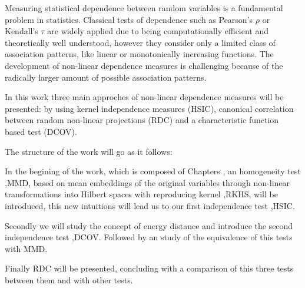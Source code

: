 Measuring statistical dependence between random variables is a fundamental problem in statistics.
Classical tests of dependence such as Pearson’s $\rho$ or Kendall’s $\tau$ are widely applied due to  being computationally efficient and theoretically well understood, however they consider only a limited class of association patterns, like linear or monotonically increasing functions. The development of non-linear dependence measures is challenging because of the radically larger amount of possible association patterns.

In this work three main approches of non-linear dependence measures will be presented: by using kernel independence measures (HSIC), canonical correlation between random non-linear projections (RDC) and a characteristic function based test (DCOV).

The structure of the work will go as it follows:

In the begining of the work, which is composed of Chapters , an homogeneity test ,MMD, based on mean embeddings of the original variables through non-linear transformations into Hilbert spaces with reproducing kernel ,RKHS, will be introduced, this new intuitions will lead us to our first independence test ,HSIC.

Secondly we will study the concept of energy distance and introduce the second independence test ,DCOV. Followed by an study of the equivalence of this tests with MMD.

Finally RDC will be presented, concluding with a comparison of this three tests between them and with other tests. 


